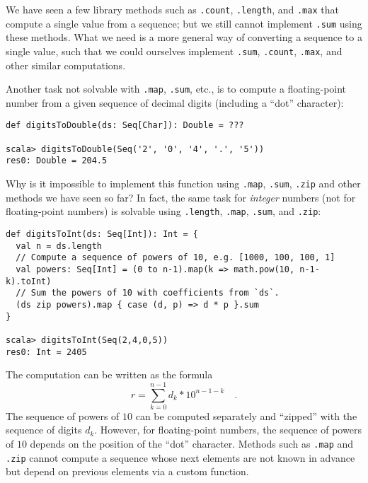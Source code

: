 We have seen a few library methods such as \lstinline!.count!,
\lstinline!.length!, and
\lstinline!.max! that compute
a single value from a sequence; but we still cannot implement \lstinline!.sum!
using these methods. What we need is a more general way of converting
a sequence to a single value, such that we could ourselves implement
\lstinline!.sum!, \lstinline!.count!,
\lstinline!.max!, and other
similar computations.

Another task not solvable with \lstinline!.map!,
\lstinline!.sum!, etc.,
is to compute a floating-point number from a given sequence of decimal
digits (including a ``dot'' character):
\begin{lstlisting}
def digitsToDouble(ds: Seq[Char]): Double = ???

scala> digitsToDouble(Seq('2', '0', '4', '.', '5'))
res0: Double = 204.5
\end{lstlisting}
Why is it impossible to implement this function using \lstinline!.map!,
\lstinline!.sum!, \lstinline!.zip!
and other methods we have seen so far? In fact, the same task for
\emph{integer} numbers (not for floating-point numbers) is solvable
using \lstinline!.length!,
\lstinline!.map!, \lstinline!.sum!,
and \lstinline!.zip!:
\begin{lstlisting}
def digitsToInt(ds: Seq[Int]): Int = {
  val n = ds.length
  // Compute a sequence of powers of 10, e.g. [1000, 100, 100, 1]
  val powers: Seq[Int] = (0 to n-1).map(k => math.pow(10, n-1-k).toInt)
  // Sum the powers of 10 with coefficients from `ds`.
  (ds zip powers).map { case (d, p) => d * p }.sum                                  
}

scala> digitsToInt(Seq(2,4,0,5))
res0: Int = 2405
\end{lstlisting}
The computation can be written as the formula
\[
r=\sum_{k=0}^{n-1}d_{k}*10^{n-1-k}\quad.
\]
The sequence of powers of $10$ can be computed separately and ``zipped''
with the sequence of digits $d_{k}$. However, for floating-point
numbers, the sequence of powers of $10$ depends on the position of
the ``dot'' character. Methods such as \lstinline!.map!
and \lstinline!.zip! cannot
compute a sequence whose next elements are not known in advance but
depend on previous elements via a custom function.

